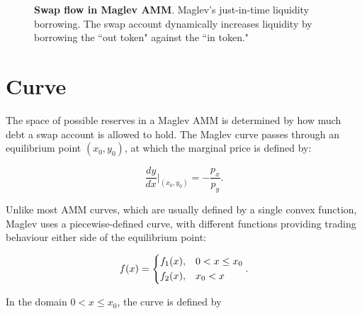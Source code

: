 \documentclass{article}
\begin{document}
\bigskip
\begin{figure}[h]
    \centering
    \caption{\textbf{Swap flow in Maglev AMM}. Maglev’s just-in-time liquidity borrowing. The swap account dynamically increases liquidity by borrowing the ``out token" against the ``in token."}
    \label{fig:maglev_liquidity}
\end{figure}

\section{Curve}

The space of possible reserves in a Maglev AMM is determined by how much debt a swap account is allowed to hold. The Maglev curve passes through an equilibrium point $(x_0, y_0)$, at which the marginal price is defined by:

\begin{equation}
\frac{dy}{dx} \Big|_{(x_0, y_0)} = -\frac{p_x}{p_y}.
\end{equation}

Unlike most AMM curves, which are usually defined by a single convex function, Maglev uses a piecewise-defined curve, with different functions providing trading behaviour either side of the equilibrium point:

\begin{equation}
    \label{eq:fx-main}
    f(x) =
    \begin{dcases}
        f_1(x), 
        & 0 < x \leq x_0 \\
        f_2(x), 
        & x_0 < x
    \end{dcases}.
\end{equation}

In the domain $0 < x \leq x_0$, the curve is defined by
\end{document}

